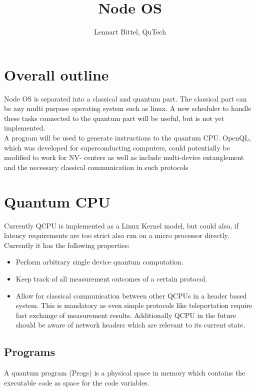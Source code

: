 \documentclass[]{article}
\title{Node OS}
\author{Lennart Bittel, QuTech}
\begin{document}
	
	\maketitle
\section{Overall outline}
Node OS is separated into a classical and quantum part. The classical part can be any multi purpose operating system such as linux. A new scheduler to handle these tasks connected to the quantum part will be useful, but is not yet implemented.\\
A program will be used to generate instructions to the quantum CPU. OpenQL, which was developed for superconducting computers, could potentially be modified to work for NV- centers as well as include multi-device entanglement and the necessary classical communication in such protocols
\section{Quantum CPU}
Currently QCPU is implemented as a Linux Kernel model, but could also, if latency requirements are too strict also run on a micro processor directly. Currently it has the following properties:
\begin{itemize}
	\item Perform arbitrary single device quantum computation.
	\item Keep track of all measurement outcomes of a certain protocol.
	\item Allow for classical communication between other QCPUs in a header based system. This is mandatory as even simple protocols like teleportation require fast exchange of measurement results. Additionally QCPU in the future should be aware of network headers which are relevant to its current state.
\end{itemize}
\subsection{Programs}
A quantum program (Progs) is a physical space in memory which contains the executable code as space for the code variables.
\end{document}

